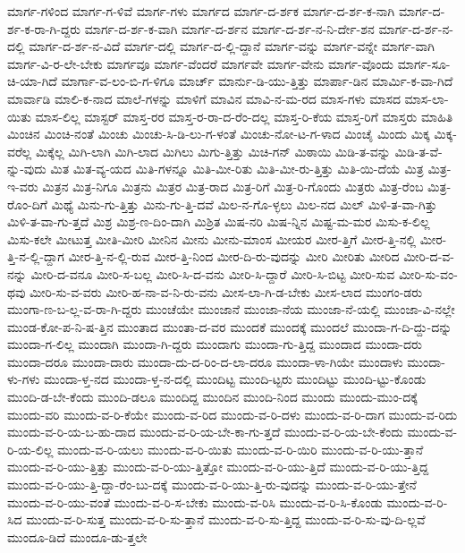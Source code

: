 {ಮಾರ್ಗ-ಗಳಿಂದ
ಮಾರ್ಗ-ಗ-ಳಿವೆ
ಮಾರ್ಗ-ಗಳು
ಮಾರ್ಗದ
ಮಾರ್ಗ-ದ-ರ್ಶಕ
ಮಾರ್ಗ-ದ-ರ್ಶ-ಕ-ನಾಗಿ
ಮಾರ್ಗ-ದ-ರ್ಶ-ಕ-ರಾ-ಗಿ-ದ್ದರು
ಮಾರ್ಗ-ದ-ರ್ಶ-ಕ-ವಾಗಿ
ಮಾರ್ಗ-ದ-ರ್ಶನ
ಮಾರ್ಗ-ದ-ರ್ಶ-ನ-ನಿ-ರ್ದೇ-ಶನ
ಮಾರ್ಗ-ದ-ರ್ಶ-ನ-ದಲ್ಲಿ
ಮಾರ್ಗ-ದ-ರ್ಶ-ನ-ವಿದೆ
ಮಾರ್ಗ-ದಲ್ಲಿ
ಮಾರ್ಗ-ದ-ಲ್ಲಿ-ದ್ದಾನೆ
ಮಾರ್ಗ-ವನ್ನು
ಮಾರ್ಗ-ವನ್ನೇ
ಮಾರ್ಗ-ವಾಗಿ
ಮಾರ್ಗ-ವಿ-ರ-ಲೇ-ಬೇಕು
ಮಾರ್ಗವೂ
ಮಾರ್ಗ-ವೆಂದರೆ
ಮಾರ್ಗವೇ
ಮಾರ್ಗ-ವೇನು
ಮಾರ್ಗ-ವೊಂದು
ಮಾರ್ಗ-ಸೂ-ಚಿ-ಯಾ-ಗಿದೆ
ಮಾರ್ಗಾ-ವ-ಲಂ-ಬಿ-ಗ-ಳಿಗೂ
ಮಾರ್ಚ್
ಮಾರ್ನು-ಡಿ-ಯು-ತ್ತಿತ್ತು
ಮಾರ್ಪಾ-ಡಿನ
ಮಾರ್ಮಿ-ಕ-ವಾ-ಗಿದೆ
ಮಾರ್ವಾಡಿ
ಮಾಲಿ-ಕ-ನಾದ
ಮಾಲೆ-ಗಳನ್ನು
ಮಾಳಿಗೆ
ಮಾವಿನ
ಮಾವಿ-ನ-ಮ-ರದ
ಮಾಸ-ಗಳು
ಮಾಸದ
ಮಾಸ-ಲಾ-ಯಿತು
ಮಾಸ-ಲಿಲ್ಲ
ಮಾಸ್ಟರ್
ಮಾಸ್ತ-ರರ
ಮಾಸ್ತ-ರ-ರಾ-ದ-ರೆಂ-ದಲ್ಲ
ಮಾಸ್ತ-ರಿ-ಕೆಯ
ಮಾಸ್ತ-ರಿಗೆ
ಮಾಸ್ತರು
ಮಾಹಿತಿ
ಮಿಂಚಿನ
ಮಿಂಚಿ-ನಂತೆ
ಮಿಂಚು
ಮಿಂಚು-ಸಿ-ಡಿ-ಲು-ಗ-ಳಂತೆ
ಮಿಂಚು-ನೋ-ಟ-ಗ-ಳಾದ
ಮಿಂಚೈ
ಮಿಂದು
ಮಿಕ್ಕ
ಮಿಕ್ಕ-ವರೆಲ್ಲ
ಮಿಕ್ಕೆಲ್ಲ
ಮಿಗಿ-ಲಾಗಿ
ಮಿಗಿ-ಲಾದ
ಮಿಗಿಲು
ಮಿಗು-ತ್ತಿತ್ತು
ಮಿಚಿ-ಗನ್
ಮಿಠಾಯಿ
ಮಿಡಿ-ತ-ವನ್ನು
ಮಿಡಿ-ತ-ವೆ-ನ್ನು-ವುದು
ಮಿತ
ಮಿತ-ವ್ಯ-ಯದ
ಮಿತಿ-ಗಳನ್ನೂ
ಮಿತಿ-ಮೀ-ರಿತು
ಮಿತಿ-ಮೀ-ರು-ತ್ತಿತ್ತು
ಮಿತಿ-ಯಿ-ದೆಯೆ
ಮಿತ್ರ
ಮಿತ್ರ-ಇ-ವರು
ಮಿತ್ರನ
ಮಿತ್ರ-ನಿಗೂ
ಮಿತ್ರನು
ಮಿತ್ರರ
ಮಿತ್ರ-ರಾದ
ಮಿತ್ರ-ರಿಗೆ
ಮಿತ್ರ-ರಿ-ಗೊಂದು
ಮಿತ್ರರು
ಮಿತ್ರ-ರೆಂಬ
ಮಿತ್ರ-ರೊಂ-ದಿಗೆ
ಮಿಥ್ಯೆ
ಮಿನು-ಗು-ತ್ತಿತ್ತು
ಮಿನು-ಗು-ತ್ತಿ-ದವೆ
ಮಿಲ-ನ-ಗೊ-ಳ್ಳಲು
ಮಿಲ-ನದ
ಮಿಲ್
ಮಿಳಿ-ತ-ವಾ-ಗಿತ್ತು
ಮಿಳಿ-ತ-ವಾ-ಗು-ತ್ತದೆ
ಮಿಶ್ರ
ಮಿಶ್ರ-ಣ-ದಿಂ-ದಾಗಿ
ಮಿಶ್ರಿತ
ಮಿಷ-ನರಿ
ಮಿಷ-ನ್ನಿನ
ಮಿಷ್ಟ-ಮ-ಮರ
ಮಿಸು-ಕ-ಲಿಲ್ಲ
ಮಿಸು-ಕಲೇ
ಮೀಟುತ್ತ
ಮೀತಿ-ಮೀರಿ
ಮೀನಿನ
ಮೀನು
ಮೀನು-ಮಾಂಸ
ಮೀಯರ
ಮೀರ-ತ್ತಿಗೆ
ಮೀರ-ತ್ತಿ-ನಲ್ಲಿ
ಮೀರ-ತ್ತಿ-ನ-ಲ್ಲಿ-ದ್ದಾಗ
ಮೀರ-ತ್ತಿ-ನ-ಲ್ಲಿ-ರುವ
ಮೀರ-ತ್ತಿ-ನಿಂದ
ಮೀರ-ದಿ-ರು-ವುದನ್ನು
ಮೀರಿ
ಮೀರಿತು
ಮೀರಿದ
ಮೀರಿ-ದ-ವ-ನನ್ನು
ಮೀರಿ-ದ-ವನೂ
ಮೀರಿ-ಸ-ಬಲ್ಲ
ಮೀರಿ-ಸಿ-ದ-ವನು
ಮೀರಿ-ಸಿ-ದ್ದಾರೆ
ಮೀರಿ-ಸಿ-ಬಿಟ್ಟ
ಮೀರಿ-ಸುವ
ಮೀರಿ-ಸು-ವಂ-ಥವು
ಮೀರಿ-ಸು-ವ-ವರು
ಮೀರಿ-ಹ-ನಾ-ವ-ನಿ-ರು-ವನು
ಮೀಸ-ಲಾ-ಗಿ-ಡ-ಬೇಕು
ಮೀಸ-ಲಾದ
ಮುಂಗಂ-ಡರು
ಮುಂಗಾ-ಣ-ಬ-ಲ್ಲ-ವ-ರಾ-ಗಿ-ದ್ದರು
ಮುಂಚೆಯೇ
ಮುಂಜಾನೆ
ಮುಂಜಾ-ನೆಯ
ಮುಂಜಾ-ನೆ-ಯಲ್ಲಿ
ಮುಂಜಾ-ವಿ-ನಲ್ಲೇ
ಮುಂಡ-ಕೋ-ಪ-ನಿ-ಷ-ತ್ತಿನ
ಮುಂತಾದ
ಮುಂತಾ-ದ-ವರ
ಮುಂದಕೆ
ಮುಂದಕ್ಕೆ
ಮುಂದಲೆ
ಮುಂದಾ-ಗ-ದಿ-ದ್ದು-ದನ್ನು
ಮುಂದಾ-ಗ-ಲಿಲ್ಲ
ಮುಂದಾಗಿ
ಮುಂದಾ-ಗಿ-ದ್ದರು
ಮುಂದಾಗು
ಮುಂದಾ-ಗು-ತ್ತಿದ್ದ
ಮುಂದಾದ
ಮುಂದಾ-ದರು
ಮುಂದಾ-ದರೂ
ಮುಂದಾ-ದಾರು
ಮುಂದಾ-ದು-ದ-ರಿಂ-ದ-ಲಾ-ದರೂ
ಮುಂದಾ-ಳಾ-ಗಿಯೇ
ಮುಂದಾಳು
ಮುಂದಾ-ಳು-ಗಳು
ಮುಂದಾ-ಳ್ತ-ನದ
ಮುಂದಾ-ಳ್ತ-ನ-ದಲ್ಲಿ
ಮುಂದಿಟ್ಟ
ಮುಂದಿ-ಟ್ಟರು
ಮುಂದಿಟ್ಟು
ಮುಂದಿ-ಟ್ಟು-ಕೊಂಡು
ಮುಂದಿ-ಡ-ಬೇ-ಕೆಂದು
ಮುಂದಿ-ಡಲೂ
ಮುಂದಿದ್ದ
ಮುಂದಿನ
ಮುಂದಿ-ನಿಂದ
ಮುಂದು
ಮುಂದು-ಮುಂ-ದಕ್ಕೆ
ಮುಂದು-ವರಿ
ಮುಂದು-ವ-ರಿ-ಕೆಯೇ
ಮುಂದು-ವ-ರಿದ
ಮುಂದು-ವ-ರಿ-ದಳು
ಮುಂದು-ವ-ರಿ-ದಾಗ
ಮುಂದು-ವ-ರಿದು
ಮುಂದು-ವ-ರಿ-ಯ-ಬ-ಹು-ದಾದ
ಮುಂದು-ವ-ರಿ-ಯ-ಬೇ-ಕಾ-ಗು-ತ್ತದೆ
ಮುಂದು-ವ-ರಿ-ಯ-ಬೇ-ಕೆಂದು
ಮುಂದು-ವ-ರಿ-ಯ-ಲಿಲ್ಲ
ಮುಂದು-ವ-ರಿ-ಯಲು
ಮುಂದು-ವ-ರಿ-ಯಿತು
ಮುಂದು-ವ-ರಿ-ಯಿರಿ
ಮುಂದು-ವ-ರಿ-ಯು-ತ್ತಾನೆ
ಮುಂದು-ವ-ರಿ-ಯು-ತ್ತಿತ್ತು
ಮುಂದು-ವ-ರಿ-ಯು-ತ್ತಿತ್ತೋ
ಮುಂದು-ವ-ರಿ-ಯು-ತ್ತಿದೆ
ಮುಂದು-ವ-ರಿ-ಯು-ತ್ತಿದ್ದ
ಮುಂದು-ವ-ರಿ-ಯು-ತ್ತಿ-ದ್ದಾ-ರೆಂ-ಬು-ದಕ್ಕೆ
ಮುಂದು-ವ-ರಿ-ಯು-ತ್ತಿ-ರು-ವುದನ್ನು
ಮುಂದು-ವ-ರಿ-ಯು-ತ್ತೇನೆ
ಮುಂದು-ವ-ರಿ-ಯು-ವಂತೆ
ಮುಂದು-ವ-ರಿ-ಸ-ಬೇಕು
ಮುಂದು-ವ-ರಿಸಿ
ಮುಂದು-ವ-ರಿ-ಸಿ-ಕೊಂಡು
ಮುಂದು-ವ-ರಿ-ಸಿದ
ಮುಂದು-ವ-ರಿ-ಸುತ್ತ
ಮುಂದು-ವ-ರಿ-ಸು-ತ್ತಾನೆ
ಮುಂದು-ವ-ರಿ-ಸು-ತ್ತಿದ್ದ
ಮುಂದು-ವ-ರಿ-ಸು-ವು-ದಿ-ಲ್ಲವೆ
ಮುಂದೂ-ಡಿದೆ
ಮುಂದೂ-ಡು-ತ್ತಲೇ
}
